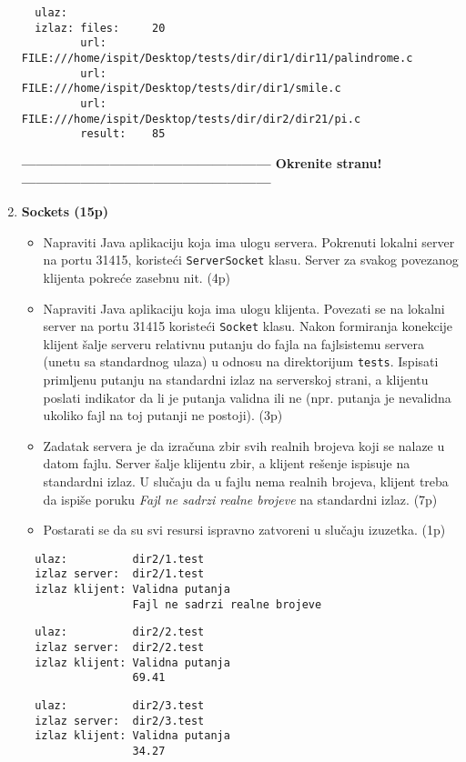 \documentclass[]{article}
\begin{document}
\begin{enumerate}
  \noindent
  \begin{lstlisting}
  ulaz:  
  izlaz: files:     20
         url:       FILE:///home/ispit/Desktop/tests/dir/dir1/dir11/palindrome.c
         url:       FILE:///home/ispit/Desktop/tests/dir/dir1/smile.c
         url:       FILE:///home/ispit/Desktop/tests/dir/dir2/dir21/pi.c
         result:    85
  \end{lstlisting}
\begin{center}
  \vspace{10pt}
  \textbf{--------------------------------------------------- Okrenite stranu! ---------------------------------------------------}
\end{center}
\newpage
  \item \textbf{Sockets (15p)}
  \\
  \begin{itemize}
    \item Napraviti Java aplikaciju koja ima ulogu servera. Pokrenuti lokalni server na portu 31415, koristeći \texttt{ServerSocket} klasu. Server za svakog povezanog klijenta pokreće zasebnu nit. \hfill (4p)
    \item Napraviti Java aplikaciju koja ima ulogu klijenta. Povezati se na lokalni server na portu 31415 koristeći \texttt{Socket} klasu. Nakon formiranja konekcije klijent šalje serveru relativnu putanju do fajla na fajlsistemu servera (unetu sa standardnog ulaza) u odnosu na direktorijum \texttt{tests}. Ispisati primljenu putanju na standardni izlaz na serverskoj strani, a klijentu poslati indikator da li je putanja validna ili ne (npr. putanja je nevalidna ukoliko fajl na toj putanji ne postoji). \hfill (3p)
    \item Zadatak servera je da izračuna zbir svih realnih brojeva koji se nalaze u datom fajlu. Server šalje klijentu zbir, a klijent rešenje ispisuje na standardni izlaz. U slučaju da u fajlu nema realnih brojeva, klijent treba da ispiše poruku \textit{Fajl ne sadrzi realne brojeve} na standardni izlaz. \hfill (7p)
    \item Postarati se da su svi resursi ispravno zatvoreni u slučaju izuzetka. \hfill (1p)
  \end{itemize}

  \noindent
  \begin{lstlisting}
  ulaz:          dir2/1.test
  izlaz server:  dir2/1.test
  izlaz klijent: Validna putanja
                 Fajl ne sadrzi realne brojeve
  \end{lstlisting}
  \begin{lstlisting}
  ulaz:          dir2/2.test
  izlaz server:  dir2/2.test
  izlaz klijent: Validna putanja
                 69.41
  \end{lstlisting}
  \begin{lstlisting}
  ulaz:          dir2/3.test
  izlaz server:  dir2/3.test
  izlaz klijent: Validna putanja
                 34.27
  \end{lstlisting}
\end{enumerate}
\end{document}
